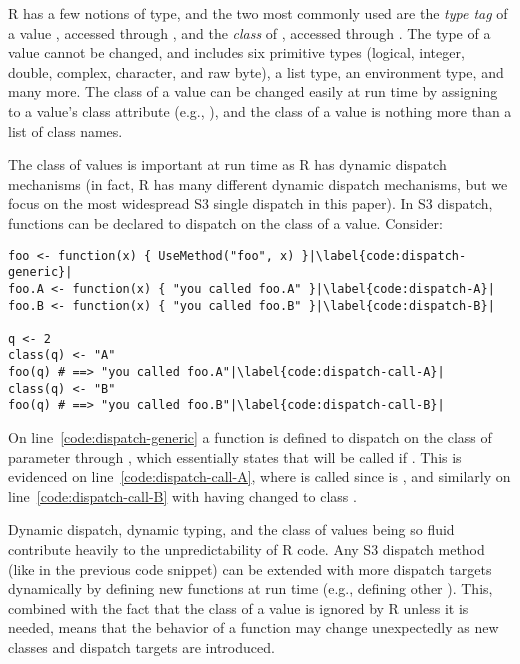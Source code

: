 \documentclass[sigplan,anonymous,review]{acmart}
\begin{document}
R has a few notions of type, and the two most commonly used are the \textit{type tag} of a value , accessed through , and the \textit{class} of , accessed through .
The  type of a value cannot be changed, and includes six primitive types (logical, integer, double, complex, character, and raw byte), a list type, an environment type, and many more.
The class of a value can be changed easily at run time by assigning to a value's class attribute (e.g., ), and the class of a value is nothing more than a list of class names.

The class of values is important at run time as R has dynamic dispatch mechanisms (in fact, R has many different dynamic dispatch mechanisms, but we focus on the most widespread S3 single dispatch in this paper). 
In S3 dispatch, functions can be declared to dispatch on the class of a value.
Consider:
\begin{lstlisting}[escapechar=|]
foo <- function(x) { UseMethod("foo", x) }|\label{code:dispatch-generic}|
foo.A <- function(x) { "you called foo.A" }|\label{code:dispatch-A}|
foo.B <- function(x) { "you called foo.B" }|\label{code:dispatch-B}|

q <- 2
class(q) <- "A"
foo(q) # ==> "you called foo.A"|\label{code:dispatch-call-A}|
class(q) <- "B"
foo(q) # ==> "you called foo.B"|\label{code:dispatch-call-B}|
\end{lstlisting}
On line~\ref{code:dispatch-generic} a function  is defined to dispatch on the class of parameter  through , which essentially states that  will be called if .
This is evidenced on line~\ref{code:dispatch-call-A}, where  is called since  is , and similarly on line~\ref{code:dispatch-call-B} with  having changed to class .

Dynamic dispatch, dynamic typing, and the class of values being so fluid contribute heavily to the unpredictability of R code.
Any S3 dispatch method (like  in the previous code snippet) can be extended with more dispatch targets dynamically by defining new functions at run time (e.g., defining other ).
 This, combined with the fact that the class of a value is ignored by R unless it is needed, means that the behavior of a function may change unexpectedly as new classes and dispatch targets are introduced.
\end{document}
